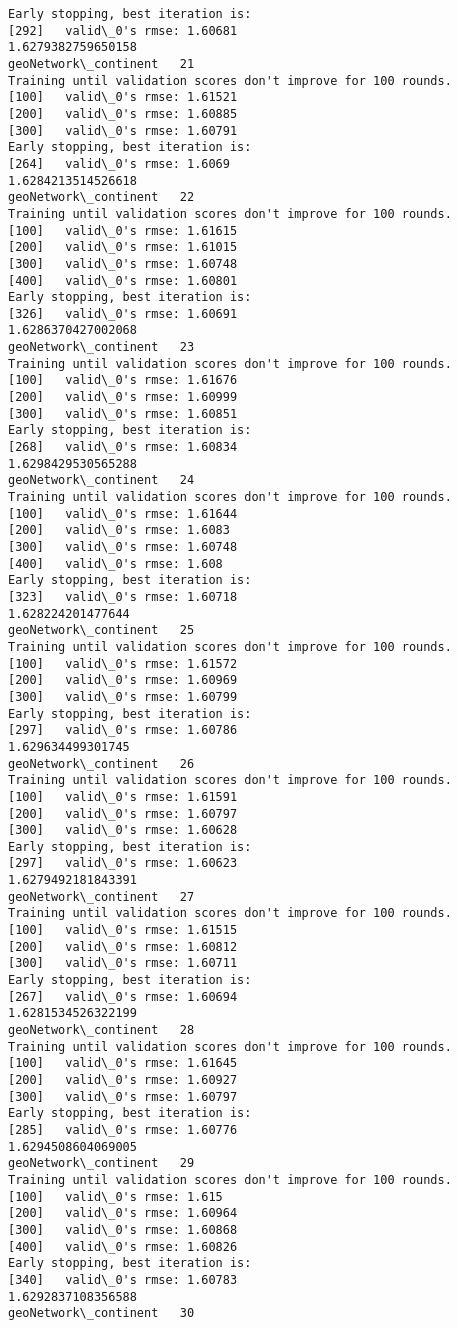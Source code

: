 \documentclass[11pt]{article}
\begin{document}
\begin{Verbatim}[commandchars=\\\{\}]
Early stopping, best iteration is:
[292]	valid\_0's rmse: 1.60681
1.6279382759650158
geoNetwork\_continent   21
Training until validation scores don't improve for 100 rounds.
[100]	valid\_0's rmse: 1.61521
[200]	valid\_0's rmse: 1.60885
[300]	valid\_0's rmse: 1.60791
Early stopping, best iteration is:
[264]	valid\_0's rmse: 1.6069
1.6284213514526618
geoNetwork\_continent   22
Training until validation scores don't improve for 100 rounds.
[100]	valid\_0's rmse: 1.61615
[200]	valid\_0's rmse: 1.61015
[300]	valid\_0's rmse: 1.60748
[400]	valid\_0's rmse: 1.60801
Early stopping, best iteration is:
[326]	valid\_0's rmse: 1.60691
1.6286370427002068
geoNetwork\_continent   23
Training until validation scores don't improve for 100 rounds.
[100]	valid\_0's rmse: 1.61676
[200]	valid\_0's rmse: 1.60999
[300]	valid\_0's rmse: 1.60851
Early stopping, best iteration is:
[268]	valid\_0's rmse: 1.60834
1.6298429530565288
geoNetwork\_continent   24
Training until validation scores don't improve for 100 rounds.
[100]	valid\_0's rmse: 1.61644
[200]	valid\_0's rmse: 1.6083
[300]	valid\_0's rmse: 1.60748
[400]	valid\_0's rmse: 1.608
Early stopping, best iteration is:
[323]	valid\_0's rmse: 1.60718
1.628224201477644
geoNetwork\_continent   25
Training until validation scores don't improve for 100 rounds.
[100]	valid\_0's rmse: 1.61572
[200]	valid\_0's rmse: 1.60969
[300]	valid\_0's rmse: 1.60799
Early stopping, best iteration is:
[297]	valid\_0's rmse: 1.60786
1.629634499301745
geoNetwork\_continent   26
Training until validation scores don't improve for 100 rounds.
[100]	valid\_0's rmse: 1.61591
[200]	valid\_0's rmse: 1.60797
[300]	valid\_0's rmse: 1.60628
Early stopping, best iteration is:
[297]	valid\_0's rmse: 1.60623
1.6279492181843391
geoNetwork\_continent   27
Training until validation scores don't improve for 100 rounds.
[100]	valid\_0's rmse: 1.61515
[200]	valid\_0's rmse: 1.60812
[300]	valid\_0's rmse: 1.60711
Early stopping, best iteration is:
[267]	valid\_0's rmse: 1.60694
1.6281534526322199
geoNetwork\_continent   28
Training until validation scores don't improve for 100 rounds.
[100]	valid\_0's rmse: 1.61645
[200]	valid\_0's rmse: 1.60927
[300]	valid\_0's rmse: 1.60797
Early stopping, best iteration is:
[285]	valid\_0's rmse: 1.60776
1.6294508604069005
geoNetwork\_continent   29
Training until validation scores don't improve for 100 rounds.
[100]	valid\_0's rmse: 1.615
[200]	valid\_0's rmse: 1.60964
[300]	valid\_0's rmse: 1.60868
[400]	valid\_0's rmse: 1.60826
Early stopping, best iteration is:
[340]	valid\_0's rmse: 1.60783
1.6292837108356588
geoNetwork\_continent   30

\end{Verbatim}
\end{document}

